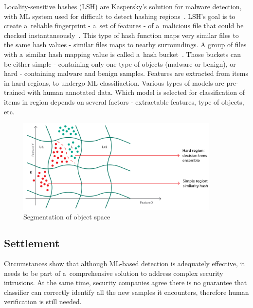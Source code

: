 Locality-sensitive hashes (LSH) are Kaspersky's solution for malware detection, with ML system used for difficult to detect hashing regions~\cite{whitepaper:kaspersky_machine_learning}.
LSH's goal is to create a~reliable fingerprint - a~set of features -  of a~malicious file that could be checked instantaneously~\cite{whitepaper:kaspersky_machine_learning}.
This type of hash function maps very similar files to the same hash values - similar files maps to nearby surroundings.
A group of files with a~similar hash mapping value is called a~hash bucket~\cite{whitepaper:kaspersky_machine_learning}.
Those buckets can be either simple - containing only one type of objects (malware or benign), or hard - containing malware and benign samples.
Features are extracted from items in hard regions, to undergo ML classifiaction.
Various types of models are pre-trained with human annotated data.
Which model is selected for classification of items in region depends on several factors - extractable features, type of objects, etc.

\begin{figure}[htb]
    \centering
    \includegraphics[width=0.9\textwidth]{imgs/kaspersky_regions.png}
    \caption{Segmentation of object space~\cite{whitepaper:kaspersky_machine_learning}}
    \label{fig:kaspersky_regions}
\end{figure}
\FloatBarrier

\subsection{Settlement}\label{subsec:settlement}

Circumstances show that although ML-based detection is adequately effective, it needs to be part of a~comprehensive solution to address complex security intrusions.
At the same time, security companies agree there is no guarantee that classifier can correctly identify all the new samples it encounters, therefore human verification is still needed.

